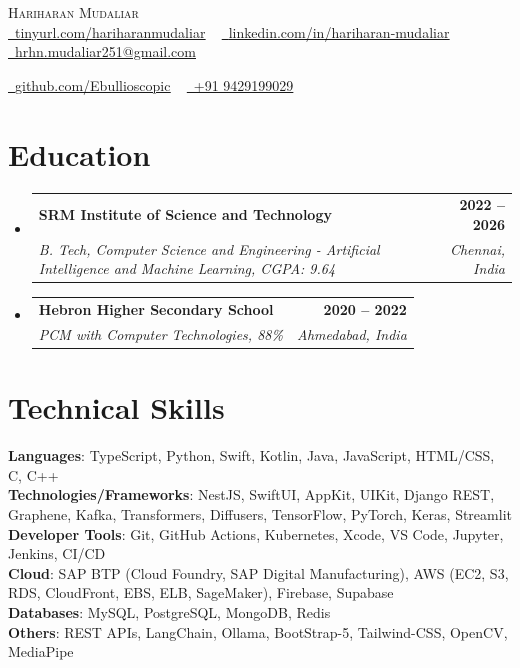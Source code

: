 \documentclass[letterpaper,11pt]{article}
\makeatletter
\newcommand{\resumeSubheading}[4]{
  \vspace{-2pt}\item
    \begin{tabular*}{1.0\textwidth}[t]{l@{\extracolsep{\fill}}r}
      \textbf{#1} & \textbf{\small #2} \\
      \textit{\small#3} & \textit{\small #4} \\
    \end{tabular*}\vspace{-7pt}
}
\newcommand{\resumeSubHeadingListStart}{\begin{itemize}[leftmargin=0.0in, label={}]}
\newcommand{\resumeSubHeadingListEnd}{\end{itemize}}
\makeatother
\begin{document}
\begin{center}
    {\Huge \scshape Hariharan Mudaliar} \\ \vspace{1pt}
    \href{https://tinyurl.com/hariharanmudaliar}{\raisebox{-0.2\height}\faLink\ \underline{tinyurl.com/hariharanmudaliar}} ~
    \href{https://linkedin.com/in/hariharan-mudaliar}{\raisebox{-0.2\height}\faLinkedin\ \underline{linkedin.com/in/hariharan-mudaliar}} ~
    \href{mailto:hrhn.mudaliar251@gmail.com}{\raisebox{-0.2\height}\faEnvelope\ \underline{hrhn.mudaliar251@gmail.com}} ~
    
    \href{https://github.com/Ebullioscopic}{\raisebox{-0.2\height}\faGithub\ \underline{github.com/Ebullioscopic}} ~
    \href{tel:+919429199029}{\raisebox{-0.2\height}\faPhone\ +91 9429199029}
\end{center}

\section{Education}
\resumeSubHeadingListStart
  \resumeSubheading
    {SRM Institute of Science and Technology}{2022 -- 2026}
    {B. Tech, Computer Science and Engineering - Artificial Intelligence and Machine Learning, CGPA: 9.64}{Chennai, India}
\resumeSubHeadingListEnd

\resumeSubHeadingListStart
  \resumeSubheading
    {Hebron Higher Secondary School}{2020 -- 2022}
    {PCM with Computer Technologies, 88\%}{Ahmedabad, India}
\resumeSubHeadingListEnd


\section{Technical Skills}
 \begin{itemize}[leftmargin=0.15in, label={}]
    \small{\item{
     \textbf{Languages}{: TypeScript, Python, Swift, Kotlin, Java, JavaScript, HTML/CSS, C, C++} \\
     \textbf{Technologies/Frameworks}{: NestJS, SwiftUI, AppKit, UIKit, Django REST, Graphene, Kafka, Transformers, Diffusers, TensorFlow, PyTorch, Keras, Streamlit} \\
     \textbf{Developer Tools}{: Git, GitHub Actions, Kubernetes, Xcode, VS Code, Jupyter, Jenkins, CI/CD} \\
     \textbf{Cloud}{: SAP BTP (Cloud Foundry, SAP Digital Manufacturing), AWS (EC2, S3, RDS, CloudFront, EBS, ELB, SageMaker), Firebase, Supabase} \\
     \textbf{Databases}{: MySQL, PostgreSQL, MongoDB, Redis} \\
     \textbf{Others}{: REST APIs, LangChain, Ollama, BootStrap-5, Tailwind-CSS, OpenCV, MediaPipe} \\
    }}
 \end{itemize}
\end{document}

